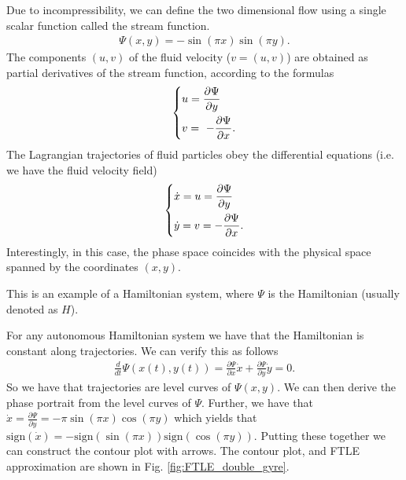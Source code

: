 \begin{ex}
	Due to incompressibility, we can define the two dimensional flow using a single scalar function called the stream function.
\begin{align}
	\Psi(x,y) = -\sin(\pi x) \sin(\pi y).
\end{align}
	The components $(u,v)$ of the fluid velocity (${v} = (u,v)$) are obtained as partial derivatives of the stream function, according to the formulas
	\begin{align}
		\begin{dcases}
			u = \frac{\partial \Psi}{\partial y} \\ 
			v = \ - \frac{\partial \Psi}{\partial x}.
		\end{dcases}
	\end{align}
The Lagrangian trajectories of fluid particles obey the differential equations (i.e. we have the fluid velocity field)
\begin{align} 
	\begin{dcases}
		\dot{x} = u =  \frac{\partial \Psi}{\partial y} \\
		\dot{y} = v = - \frac{\partial \Psi}{\partial x}.
	\end{dcases}
\end{align}
Interestingly, in this case, the phase space coincides with the physical space spanned by the coordinates $(x,y)$.
\begin{remark}[]
	This is an example of a Hamiltonian system, where $\Psi$ is the Hamiltonian (usually denoted as $H$).
\end{remark}
For any autonomous Hamiltonian system we have that the Hamiltonian is constant along trajectories. We can verify this as follows
\begin{align}
	\frac{d}{dt}\Psi(x(t),y(t)) = \frac{\partial \Psi}{\partial x}\dot{x} + \frac{\partial \Psi}{\partial y}\dot{y} = 0.
\end{align}
So we have that trajectories are level curves of $\Psi(x,y)$. We can then derive the phase portrait from the level curves of $\Psi$. Further, we have that $\dot{x} = \frac{\partial \Psi}{\partial y} = - \pi \sin(\pi x) \cos(\pi y)$ which yields that $ \textrm{sign} (\dot{x}) = -  \textrm{sign} (\sin(\pi x))  \textrm{sign} (\cos(\pi y))$. Putting these together we can construct the contour plot with arrows. The contour plot, and FTLE approximation are shown in Fig. \ref{fig:FTLE_double_gyre}.


\end{ex}
